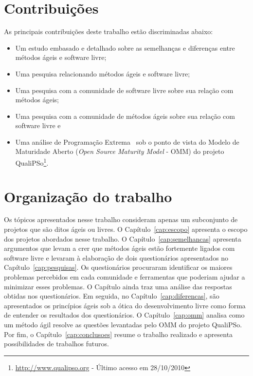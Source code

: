 \section{Contribuições}
\label{sec:contribucoes}

As principais contribuições deste trabalho estão discriminadas abaixo:

\begin{itemize}
\item Um estudo embasado e detalhado sobre as semelhanças e diferenças
  entre métodos ágeis e software livre;
\item Uma pesquisa relacionando métodos ágeis e software livre;
\item Uma pesquisa com a comunidade de software livre sobre sua
  relação com métodos ágeis;
\item Uma pesquisa com a comunidade de métodos ágeis sobre sua relação
  com software livre e
\item Uma análise de Programação Extrema~\cite{XP01} sob o ponto de
  vista do Modelo de Maturidade Aberto (\emph{Open Source Maturity
    Model} - OMM) do projeto
  QualiPSo\footnote{\url{http://www.qualipso.org} - Último acesso em
    28/10/2010}.
\end{itemize}

\section{Organização do trabalho}
\label{sec:organizacao_trabalho}

Os tópicos apresentados nesse trabalho consideram apenas um
subconjunto de projetos que são ditos ágeis ou livres. O
Capítulo~\ref{cap:escopo} apresenta o escopo dos projetos abordados
nesse trabalho. O Capítulo~\ref{cap:semelhancas} apresenta argumentos
que levam a crer que métodos ágeis estão fortemente ligados com
software livre e levaram à elaboração de dois questionários
apresentados no Capítulo~\ref{cap:pesquisas}. Os questionários
procuraram identificar os maiores problemas percebidos em cada
comunidade e ferramentas que poderiam ajudar a minimizar esses
problemas. O Capítulo ainda traz uma análise das respostas obtidas nos
questionários.  Em seguida, no Capítulo~\ref{cap:diferencas}, são
apresentados os princípios ágeis sob a ótica do desenvolvimento livre
como forma de entender os resultados dos questionários. O
Capítulo~\ref{cap:omm} analisa como um método ágil resolve as questões
levantadas pelo OMM do projeto QualiPSo.  Por fim, o
Capítulo~\ref{cap:conclusoes} resume o trabalho realizado e apresenta
possibilidades de trabalhos futuros.
